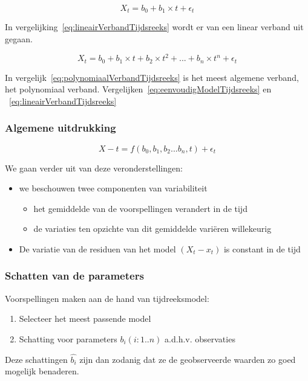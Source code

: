 \documentclass[a4paper,12pt]{article}
\begin{document}
\begin{equation}
X_t = b_0 + b_1 \times t + \epsilon_t
\label{eq:lineairVerbandTijdsreeks}
\end{equation}

In vergelijking~\ref{eq:lineairVerbandTijdsreeks} wordt er van een linear verband uit gegaan.

\begin{equation}
X_t=b_0+b_1\times t + b_2 \times t^2 + ... + b_n \times t^n + \epsilon_t
\label{eq:polynomiaalVerbandTijdsreeks}
\end{equation}

In vergelijk~\ref{eq:polynomiaalVerbandTijdsreeks} is het meest algemene verband, het polynomiaal verband. Vergelijken~\ref{eq:eenvoudigModelTijdsreeks} en ~\ref{eq:lineairVerbandTijdsreeks}

\subsubsection{Algemene uitdrukking}
\begin{equation}
X-t = f(b_0,b_1,b_2 ... b_n,t)+\epsilon_t
\label{eq:AlgemeneUitdrukkingTijdreeks}
\end{equation}

We gaan verder uit van deze veronderstellingen:
\begin{itemize}
\item we beschouwen twee componenten van variabiliteit
	\begin{itemize}
	\item het gemiddelde van de voorspellingen verandert in de tijd
	\item de variaties ten opzichte van dit gemiddelde variëren willekeurig
	\end{itemize}
\item De variatie van de residuen van het model $(X_t - x_t)$ is constant in de tijd
\end{itemize}

\subsubsection{Schatten van de parameters}
Voorspellingen maken aan de hand van tijdreeksmodel:
\begin{enumerate}
\item Selecteer het meest passende model
\item Schatting voor parameters $b_i(i:1..n)$ a.d.h.v. observaties
\end{enumerate}
Deze schattingen $\hat{b_i}$ zijn dan zodanig dat ze de geobserveerde waarden zo goed mogelijk benaderen.
\end{document}
